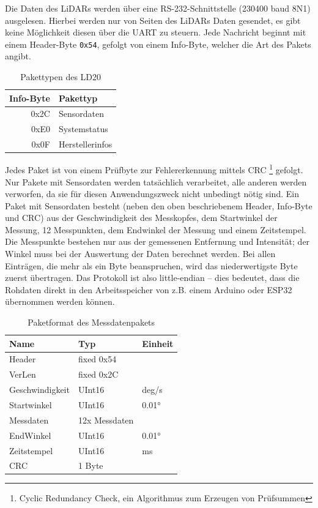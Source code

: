 Die Daten des LiDARs werden über eine RS-232-Schnittstelle (230400 baud 8N1) ausgelesen.
%
Hierbei werden nur von Seiten des LiDARs Daten gesendet,
es gibt keine Möglichkeit diesen über die UART zu steuern.
%
Jede Nachricht beginnt mit einem Header-Byte \texttt{0x54},
gefolgt von einem Info-Byte,
welcher die Art des Pakets angibt.
\begin{table}[H]
    \centering
    \begin{tabular}{r|l}
    Info-Byte & Pakettyp   \\ \hline
    0x2C      & Sensordaten \\
    0xE0      & Systemstatus \\
    0x0F      & Herstellerinfos   
    \end{tabular}
    \caption{Pakettypen des LD20}
    \label{tab:ld20-packet-overview}
\end{table}
Jedes Paket ist von einem Prüfbyte zur Fehlererkennung mittels CRC%
\footnote{Cyclic Redundancy Check, ein Algorithmus zum Erzeugen von Prüfsummen}
gefolgt.
%
Nur Pakete mit Sensordaten werden tatsächlich verarbeitet,
alle anderen werden verworfen,
da sie für diesen Anwendungszweck nicht unbedingt nötig sind.
%
Ein Paket mit Sensordaten besteht (neben den oben beschriebenem Header, Info-Byte und CRC)
aus der Geschwindigkeit des Messkopfes,
dem Startwinkel der Messung,
12 Messpunkten,
dem Endwinkel der Messung
und einem Zeitstempel.
%
Die Messpunkte bestehen nur aus der gemessenen Entfernung und Intensität;
der Winkel muss bei der Auswertung der Daten berechnet werden.
%
Bei allen Einträgen, die mehr als ein Byte beanspruchen,
wird das niederwertigste Byte zuerst übertragen.
%
Das Protokoll ist also little-endian --
dies bedeutet, dass die Rohdaten direkt in den Arbeitsspeicher von z.B. einem Arduino oder ESP32 übernommen werden können.
\begin{table}[H]
    \centering
    \begin{tabular}{l|l|l}
    Name            & Typ           & Einheit  \\ \hline
    Header          & fixed 0x54    &   \\
    VerLen          & fixed 0x2C    &   \\
    Geschwindigkeit & UInt16        & deg/s \\
    Startwinkel     & UInt16        & 0.01°  \\
    Messdaten       & 12x Messdaten &    \\
    EndWinkel       & UInt16        & 0.01° \\
    Zeitstempel     & UInt16        & ms \\
    CRC             & 1 Byte        &
    \end{tabular}
    \caption{Paketformat des Messdatenpakets}
    \label{tab:ld20-measurement-packet}
\end{table}

